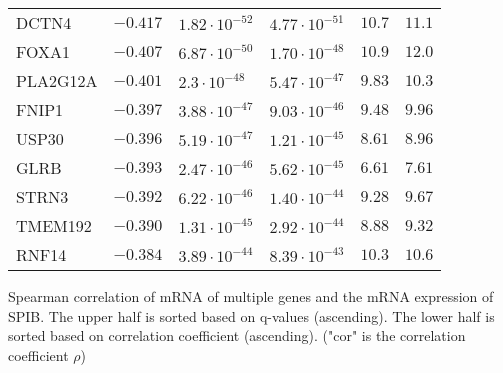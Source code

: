 \begin{table}[!p]
\begin{center}
\begin{tabular}{l|lllll}
        DCTN4	&	$-0.417$	&	$1.82\cdot 10^{-52}$	&	$4.77 \cdot 10^{-51}$	&	$10.7$	&	$11.1$\\ 
        FOXA1	&	$-0.407$	&	$6.87\cdot 10^{-50}$	&	$1.70 \cdot 10^{-48}$  &	$10.9$	&	$12.0$\\ 
        PLA2G12A	&	$-0.401$	&	$2.3\cdot 10^{-48}$	&	$5.47 \cdot 10^{-47}$	&	$9.83$	&	$10.3$\\ 
        FNIP1	&	$-0.397$	&	$3.88\cdot 10^{-47}$	&	$9.03 \cdot 10^{-46}$	&	$9.48$	&	$9.96$\\ 
        USP30	&	$-0.396$	&	$5.19\cdot 10^{-47}$	&	$1.21 \cdot 10^{-45}$	&	$8.61$	&	$8.96$\\ 
        GLRB	&	$-0.393$	&	$2.47\cdot 10^{-46}$	&	$5.62 \cdot 10^{-45}$	&	$6.61$	&	$7.61$\\ 
        STRN3	&	$-0.392$	&	$6.22\cdot 10^{-46}$	&	$1.40 \cdot 10^{-44}$  &	$9.28$	&	$9.67$\\ 
        TMEM192	&	$-0.390$	&	$1.31\cdot 10^{-45}$	&	$2.92 \cdot 10^{-44}$	&	$8.88$	&	$9.32$\\ 
        RNF14	&	$-0.384$	&	$3.89\cdot 10^{-44}$	&	$8.39 \cdot 10^{-43}$	&	$10.3$	&	$10.6$\\ 
    \end{tabular}
    \end{center}
    Spearman correlation of mRNA of multiple genes and the mRNA expression of SPIB. The upper half is sorted based on q-values (ascending). The lower half is sorted based on correlation coefficient (ascending). ("cor" is the correlation coefficient $\rho$)
    \label{mrna_table}
\end{table} 
    